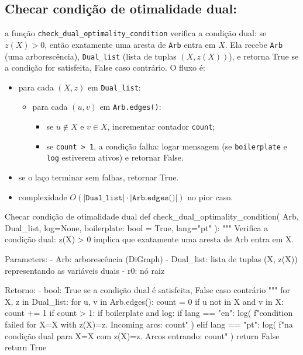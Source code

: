 \subsection{Checar condição de otimalidade dual:}
a função \texttt{check\_dual\_optimality\_condition} verifica a condição dual: se \(z(X)>0\), então exatamente uma aresta de \texttt{Arb} entra em \(X\). Ela recebe \texttt{Arb} (uma arborescência), \texttt{Dual\_list} (lista de tuplas \((X,z(X))\)), e retorna True se a condição for satisfeita, False caso contrário. O fluxo é:
\begin{itemize}\setlength{\itemsep}{1pt}
	\item para cada \((X,z)\) em \texttt{Dual\_list}:
	      \begin{itemize}\setlength{\itemsep}{1pt}
		      \item para cada \((u,v)\) em \texttt{Arb.edges()}:
		            \begin{itemize}\setlength{\itemsep}{1pt}
			            \item se \(u\notin X\) e \(v\in X\), incrementar contador \texttt{count};
			            \item se \texttt{count > 1}, a condição falha: logar mensagem (se \texttt{boilerplate} e \texttt{log} estiverem ativos) e retornar False.
		            \end{itemize}
	      \end{itemize}
	\item se o laço terminar sem falhas, retornar True.
	\item complexidade \(O(|\texttt{Dual\_list}| \cdot |\texttt{Arb.edges()}|)\) no pior caso.
\end{itemize}

\begin{pybox}{Checar condição de otimalidade dual}
	def check_dual_optimality_condition(
	Arb, Dual_list, log=None, boilerplate: bool = True, lang="pt"
	):
	"""
	Verifica a condição dual: z(X) > 0 implica que exatamente uma aresta de Arb entra em X.

	Parameters:
	- Arb: arborescência (DiGraph)
	- Dual_list: lista de tuplas (X, z(X)) representando as variáveis duais
	- r0: nó raiz

	Retorno:
	- bool: True se a condição dual é satisfeita, False caso contrário
	"""
	for X, z in Dual_list:
	for u, v in Arb.edges():
	count = 0
	if u not in X and v in X:
	count += 1
	if count > 1:
	if boilerplate and log:
	if lang == "en":
	log(
	f"\nDual condition failed for X={X} with z(X)={z}. Incoming arcs: {count}"
	)
	elif lang == "pt":
	log(
	f"\nFalha na condição dual para X={X} com z(X)={z}. Arcos entrando: {count}"
	)
	return False
	return True

\end{pybox}

